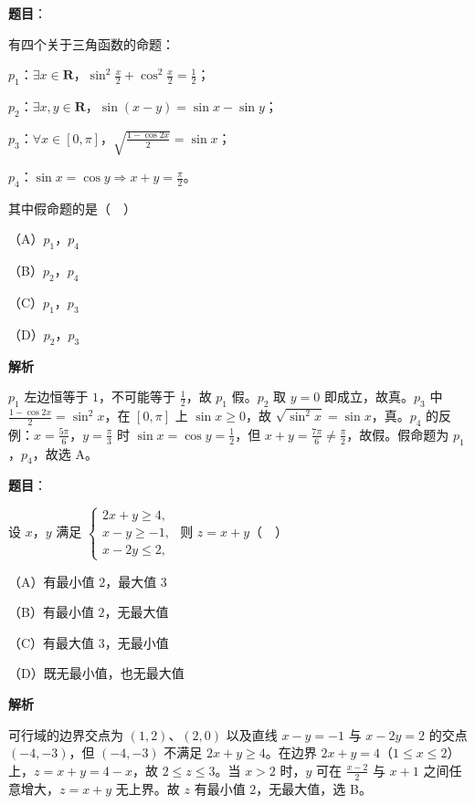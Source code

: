 \begin{answer}

\textbf{题目}：

有四个关于三角函数的命题：

$p_1$：$\exists x\in\mathbf R$，$\sin^2\frac x2+\cos^2\frac x2=\frac12$；

$p_2$：$\exists x,y\in\mathbf R$，$\sin(x-y)=\sin x-\sin y$；

$p_3$：$\forall x\in[0,\pi]$，$\sqrt{\frac{1-\cos2x}{2}}=\sin x$；

$p_4$：$\sin x=\cos y\Rightarrow x+y=\frac{\pi}{2}$。

其中假命题的是（　）

（A）$p_1$，$p_4$

（B）$p_2$，$p_4$

（C）$p_1$，$p_3$

（D）$p_2$，$p_3$

\textbf{解析}

$p_1$ 左边恒等于 $1$，不可能等于 $\frac12$，故 $p_1$ 假。$p_2$ 取 $y=0$ 即成立，故真。$p_3$ 中 $\frac{1-\cos2x}{2}=\sin^2x$，在 $[0,\pi]$ 上 $\sin x\geqslant0$，故 $\sqrt{\sin^2x}=\sin x$，真。$p_4$ 的反例：$x=\frac{5\pi}{6}$，$y=\frac{\pi}{3}$ 时 $\sin x=\cos y=\frac12$，但 $x+y=\frac{7\pi}{6}\neq\frac{\pi}{2}$，故假。假命题为 $p_1$，$p_4$，故选 A。


\end{answer}
\begin{answer}

\textbf{题目}：

设 $x$，$y$ 满足 $\begin{cases}2x+y\geqslant4,\\ x-y\geqslant-1,\\ x-2y\leqslant2,\end{cases}$ 则 $z=x+y$（　）

（A）有最小值 $2$，最大值 $3$

（B）有最小值 $2$，无最大值

（C）有最大值 $3$，无最小值

（D）既无最小值，也无最大值

\textbf{解析}

可行域的边界交点为 $(1,2)$、$(2,0)$ 以及直线 $x-y=-1$ 与 $x-2y=2$ 的交点 $(-4,-3)$，但 $(-4,-3)$ 不满足 $2x+y\geqslant4$。在边界 $2x+y=4$（$1\leqslant x\leqslant2$）上，$z=x+y=4-x$，故 $2\leqslant z\leqslant3$。当 $x>2$ 时，$y$ 可在 $\frac{x-2}{2}$ 与 $x+1$ 之间任意增大，$z=x+y$ 无上界。故 $z$ 有最小值 $2$，无最大值，选 B。


\end{answer}
